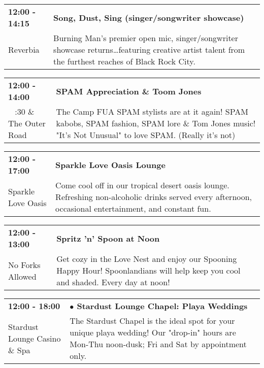 \begin{tabular}{ p{1in} p{2.2in} }
    \textbf{12:00 - 14:15} & \textbf{Song, Dust, Sing (singer/songwriter showcase)} \\
    Reverbia \newline  & Burning Man's premier open mic, singer/songwriter showcase returns\ldots featuring creative artist talent from the furthest reaches of Black Rock City. \\
    \hline 
\end{tabular}
    
\begin{tabular}{ p{1in} p{2.2in} }
    \textbf{12:00 - 14:00} & \textbf{SPAM Appreciation \& Toom Jones} \\
    ~ \newline 4:30 \& The Outer Road  & The Camp FUA SPAM stylists are at it again! SPAM kabobs, SPAM fashion, SPAM lore \& Tom Jones music! "It's Not Unusual" to love SPAM. (Really it's not) \\
    \hline 
\end{tabular}
    
\begin{tabular}{ p{1in} p{2.2in} }
    \textbf{12:00 - 17:00} & \textbf{Sparkle Love Oasis Lounge} \\
    Sparkle Love Oasis \newline  & Come cool off in our tropical desert oasis lounge. Refreshing non-alcoholic drinks served every afternoon, occasional entertainment, and constant fun. \\
    \hline 
\end{tabular}
    
\begin{tabular}{ p{1in} p{2.2in} }
    \textbf{12:00 - 13:00} & \textbf{Spritz 'n' Spoon at Noon} \\
    No Forks Allowed \newline  & Get cozy in the Love Nest and enjoy our Spooning Happy Hour! Spoonlandians will help keep you cool and shaded. Every day at noon! \\
    \hline 
\end{tabular}
    
\begin{tabular}{ p{1in} p{2.2in} }
    \textbf{12:00 - 18:00} & \textbf{$\bullet$	Stardust Lounge Chapel: Playa Weddings} \\
    Stardust Lounge Casino \& Spa \newline  & The Stardust Chapel is the ideal spot for your unique playa wedding! Our "drop-in" hours are Mon-Thu noon-dusk; Fri and Sat by appointment only. \\
    \hline 
\end{tabular}
    
